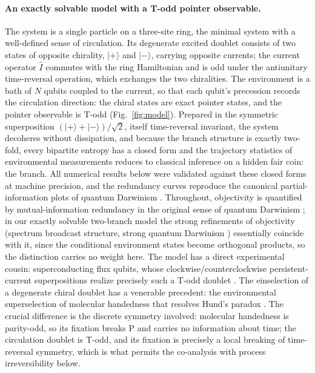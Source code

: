\documentclass[11pt]{article}
\newcommand{\Iop}{\hat{I}}
\begin{document}
\paragraph{An exactly solvable model with a T-odd pointer observable.}
The system is a single particle on a three-site ring, the minimal system with a well-defined sense of circulation. Its degenerate excited doublet consists of two states of opposite chirality, $|{+}\rangle$ and $|{-}\rangle$, carrying opposite currents; the current operator $\Iop$ commutes with the ring Hamiltonian and is odd under the antiunitary time-reversal operation, which exchanges the two chiralities. The environment is a bath of $N$ qubits coupled to the current, so that each qubit's precession records the circulation direction: the chiral states are exact pointer states, and the pointer observable is T-odd (Fig.~\ref{fig:model}). Prepared in the symmetric superposition $(|{+}\rangle+|{-}\rangle)/\sqrt2$, itself time-reversal invariant, the system decoheres without dissipation, and because the branch structure is exactly two-fold, every bipartite entropy has a closed form and the trajectory statistics of environmental measurements reduces to classical inference on a hidden fair coin: the branch. All numerical results below were validated against these closed forms at machine precision, and the redundancy curves reproduce the canonical partial-information plots of quantum Darwinism \cite{Riedel2012}. Throughout, objectivity is quantified by mutual-information redundancy in the original sense of quantum Darwinism \cite{Ollivier2004,Zurek2009}; in our exactly solvable two-branch model the strong refinements of objectivity (spectrum broadcast structure, strong quantum Darwinism \cite{Korbicz2021,Le2019}) essentially coincide with it, since the conditional environment states become orthogonal products, so the distinction carries no weight here. The model has a direct experimental cousin: superconducting flux qubits, whose clockwise/counterclockwise persistent-current superpositions realize precisely such a T-odd doublet \cite{Friedman2000}. The einselection of a degenerate chiral doublet has a venerable precedent: the environmental superselection of molecular handedness that resolves Hund's paradox \cite{Harris1981,Trost2009}. The crucial difference is the discrete symmetry involved: molecular handedness is parity-odd, so its fixation breaks P and carries no information about time; the circulation doublet is T-odd, and its fixation is precisely a local breaking of time-reversal symmetry, which is what permits the co-analysis with process irreversibility below.
\end{document}
